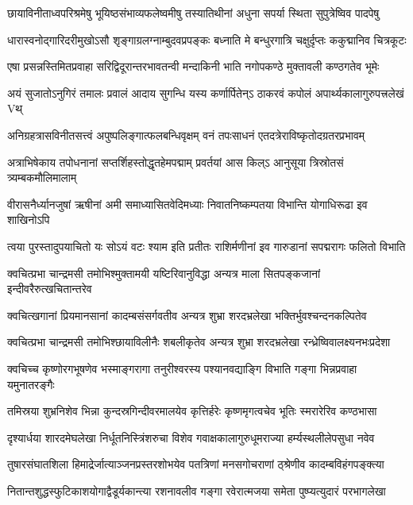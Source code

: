 \twolineshloka
{छायाविनीताध्वपरिश्रमेषु भूयिष्ठसंभाव्यफलेष्वमीषु}
{तस्यातिथीनां अधुना सपर्या स्थिता सुपुत्रेष्विव पादपेषु}%

\twolineshloka
{धारास्वनोद्गारिदरीमुखोऽसौ शृङ्गाग्रलग्नाम्बुदवप्रपङ्कः}
{बध्नाति मे बन्धुरगात्रि चक्षुर्दृप्तः ककुद्मानिव चित्रकूटः}%

\twolineshloka
{एषा प्रसन्नस्तिमितप्रवाहा सरिद्विदूरान्तरभावतन्वी}
{मन्दाकिनी भाति नगोपकण्ठे मुक्तावली कण्ठगतेव भूमेः}%

\twolineshloka
{अयं सुजातोऽनुगिरं तमालः प्रवालं आदाय सुगन्धि यस्य}
{कर्णार्पितेन्ऽ ठाकरवं कपोलं अपार्थ्यकालागुरुपत्त्रलेखं Vथ्}%

\twolineshloka
{अनिग्रहत्रासविनीतसत्त्वं अपुष्पलिङ्गात्फलबन्धिवृक्षम्}
{वनं तपःसाधनं एतदत्रेराविष्कृतोदग्रतरप्रभावम्}%

\twolineshloka
{अत्राभिषेकाय तपोधनानां सप्तर्शिहस्तोद्धृतहेमपद्माम्}
{प्रवर्तयां आस किल्ऽ आनुसूया त्रिस्रोतसं त्र्यम्बकमौलिमालाम्}%

\twolineshloka
{वीरासनैर्ध्यानजुषां ऋषीनां अमी समाध्यासितवेदिमध्याः}
{निवातनिष्कम्पतया विभान्ति योगाधिरूढा इव शाखिनोऽपि}%

\twolineshloka
{त्वया पुरस्तादुपयाचितो यः सोऽयं वटः श्याम इति प्रतीतः}
{राशिर्मणीनां इव गारुडानां सपद्मरागः फलितो विभाति}%

\twolineshloka
{क्वचित्प्रभा चान्द्रमसी तमोभिश्मुक्तामयी यष्टिरिवानुविद्धा}
{अन्यत्र माला सितपङ्कजानां इन्दीवरैरुत्खचितान्तरेव}%

\twolineshloka
{क्वचित्खगानां प्रियमानसानां कादम्बसंसर्गवतीव}
{अन्यत्र शुभ्रा शरदभ्रलेखा भक्तिर्भुवश्चन्दनकल्पितेव}%

\twolineshloka
{क्वचित्प्रभा चान्द्रमसी तमोभिश्छायाविलीनैः शबलीकृतेव}
{अन्यत्र शुभ्रा शरदभ्रलेखा रन्ध्रेष्विवालक्ष्यनभःप्रदेशा}%

\twolineshloka
{क्वचिच्च कृष्णोरगभूषणेव भस्माङ्गरागा तनुरीश्वरस्य}
{पश्यानवद्याङ्गि विभाति गङ्गा भिन्नप्रवाहा यमुनातरङ्गैः}%

\twolineshloka
{तमिस्रया शुभ्रनिशेव भिन्ना कुन्दस्रगिन्दीवरमालयेव}
{कृत्तिर्हरेः कृष्णमृगत्वचेव भूतिः स्मरारेरिव कण्ठभासा}%

\twolineshloka
{दृश्यार्धया शारदमेघलेखा निर्धूतनिस्त्रिंशरुचा विशेव}
{गवाक्षकालागुरुधूमराज्या हर्म्यस्थलीलेपसुधा नवेव}%

\twolineshloka
{तुषारसंघातशिला हिमाद्रेर्जात्याञ्जनप्रस्तरशोभयेव}
{पतत्रिणां मनसगोचराणां ठ्श्रेणीव कादम्बविहंगपङ्क्त्या}%

\twolineshloka
{नितान्तशुद्धस्फुटिकाशयोगाद्वैडूर्यकान्त्या रशनावलीव}
{गङ्गा रवेरात्मजया समेता पुष्प्यत्युदारं परभागलेखा}%

